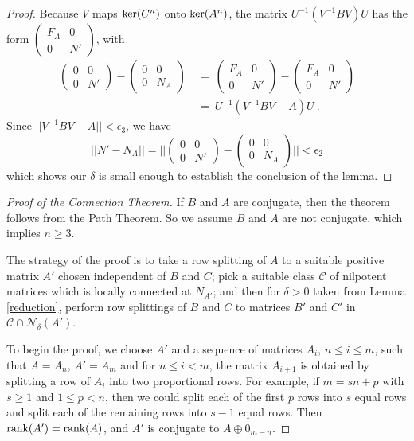 \documentclass{amsart}
\theoremstyle{definition}
\theoremstyle{remark}
\numberwithin{equation}{section}
\begin{document}
{{\begin{proof}
Because $V$ maps $\textnormal{ker}(C^n)$ onto $\textnormal{ker}(A^n)$, 
the matrix 
$U^{-1}(V^{-1}BV)U$ has the form 
$\left(
\begin{smallmatrix} F_A & 0 \\ 0 & N' 
\end{smallmatrix}
\right) $, with 
\begin{align*} 
\begin{pmatrix} 0 & 0 \\ 0 & N' 
\end{pmatrix} 
- 
\begin{pmatrix} 0 & 0 \\ 0 & N_A 
\end{pmatrix} 
\ &= \ 
\begin{pmatrix} F_A & 0 \\ 0 & N' 
\end{pmatrix} 
-
\begin{pmatrix} F_A & 0 \\ 0 & N' 
\end{pmatrix} 
\\ 
&= \
 U^{-1}(V^{-1}BV-A)U
\ . 
\end{align*} 
Since $|| V^{-1}BV - A||<\epsilon_3$, we have 
\[
||N'-N_A||= 
\Bigg|\Bigg|
\begin{pmatrix} 0 & 0 \\ 0 & N' 
\end{pmatrix} 
- 
\begin{pmatrix} 0 & 0 \\ 0 & N_A 
\end{pmatrix} 
\Bigg|\Bigg|
< \epsilon_2
\] 
which shows  our $\delta $ is small enough 
to establish the conclusion of the lemma. 
\end{proof}



\begin{proof}
[Proof of the Connection Theorem]
If $B$ and $A$ are conjugate, then the theorem follows 
from the Path Theorem. So we assume $B$ and $A$ are 
not conjugate, which implies $n\geq 3$. 

The strategy of the proof is to take a row splitting of 
$A$ to a suitable positive matrix $A'$ chosen independent of $B$ and $C$; 
pick a suitable class $\mathcal C$ of nilpotent matrices 
which is locally connected at $N_{A'}$; and then for 
 $\delta >0  $ taken from Lemma \ref{reduction}, 
perform  row splittings of $B$ and $C$ 
to matrices $B'$ and $C'$ in $\mathcal C\cap \mathcal N_{\delta}(A')$. 


To begin the proof, we choose 
$A'$ and a sequence of matrices 
$A_i$, 
$n\leq i\leq m$, such that  $A=A_n$, $A'=A_m$ 
and for $n\leq i < m$, the matrix $A_{i+1}$ 
is obtained by splitting a row of $A_i$ 
into two proportional rows. 
 For example, if $m=sn+p$ with 
$s\geq 1 $ and $1\leq p <n$, then we could split 
each of the first $p$ rows into $s$ equal rows and split 
each of the remaining rows into $s-1$ equal rows. 
Then $\textnormal{rank}(A')=
\textnormal{rank}(A)$, and  $A'$ is conjugate to 
$A\oplus 0_{m-n}$. 



\end{proof}}}
\end{document}
